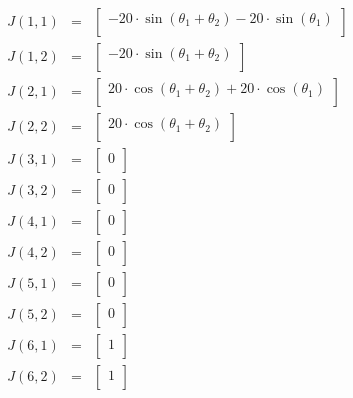 \begin{eqnarray}
J(1,1)&=&\begin{bmatrix}
- 20\cdot \sin(\theta_1 + \theta_2) - 20\cdot \sin(\theta_1)\\ 
\end{bmatrix}
 \nonumber \\J(1,2)&=&\begin{bmatrix}
-20\cdot \sin(\theta_1 + \theta_2)\\ 
\end{bmatrix}
 \nonumber \\J(2,1)&=&\begin{bmatrix}
20\cdot \cos(\theta_1 + \theta_2) + 20\cdot \cos(\theta_1)\\ 
\end{bmatrix}
 \nonumber \\J(2,2)&=&\begin{bmatrix}
20\cdot \cos(\theta_1 + \theta_2)\\ 
\end{bmatrix}
 \nonumber \\J(3,1)&=&\begin{bmatrix}
0\\ 
\end{bmatrix}
 \nonumber \\J(3,2)&=&\begin{bmatrix}
0\\ 
\end{bmatrix}
 \nonumber \\J(4,1)&=&\begin{bmatrix}
0\\ 
\end{bmatrix}
 \nonumber \\J(4,2)&=&\begin{bmatrix}
0\\ 
\end{bmatrix}
 \nonumber \\J(5,1)&=&\begin{bmatrix}
0\\ 
\end{bmatrix}
 \nonumber \\J(5,2)&=&\begin{bmatrix}
0\\ 
\end{bmatrix}
 \nonumber \\J(6,1)&=&\begin{bmatrix}
1\\ 
\end{bmatrix}
 \nonumber \\J(6,2)&=&\begin{bmatrix}
1\\ 
\end{bmatrix}
 \nonumber\end{eqnarray}
